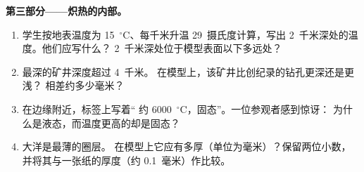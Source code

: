 \begin{problem}
\medskip
\noindent\textbf{第三部分——炽热的内部。}
\begin{enumerate}[resume]
  \item 学生按地表温度为
        15~$^\circ$C、每千米升温 29~摄氏度计算，写出 2~千米深处的温度。他们应写什么？
        2~千米深处位于模型表面以下多远处？
  \item 最深的矿井深度超过 4~千米。
        在模型上，该矿井比创纪录的钻孔更深还是更浅？
        相差约多少毫米？
  \item 在边缘附近，标签上写着“
        约 6000~$^\circ$C，固态”。一位参观者感到惊讶：
        为什么是液态，而温度更高的却是固态？
  \item 大洋是最薄的圈层。
        在模型上它应有多厚（单位为毫米）？保留两位小数，
        并将其与一张纸的厚度（约 0.1~毫米）作比较。
\end{enumerate}
\end{problem}
